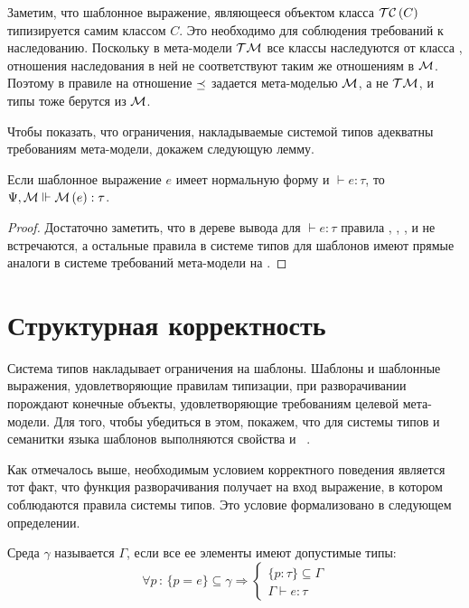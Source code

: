 {{Заметим, что шаблонное выражение, являющееся объектом класса $\mathcal{TC}\left(C\right)$ типизируется самим классом $C$. Это необходимо для соблюдения требований к наследованию. Поскольку в мета-модели $\mathcal{TM}$ все классы наследуются от класса , отношения наследования в ней не соответствуют таким же отношениям в $\mathcal{M}$. Поэтому в правиле  на  отношение $\preceq$ задается мета-моделью $\mathcal{M}$, а не $\mathcal{TM}$, и типы тоже берутся из $\mathcal{M}$. 

Чтобы показать, что ограничения, накладываемые системой типов адекватны требованиям мета-модели, докажем следующую лемму.
\begin{Lemm}\label{LemmNF}
Если шаблонное выражение $e$ имеет нормальную форму и $\vdash e : \tau$, то $\Psi, \mathcal{M} \Vdash \mathcal{M}\left(e\right) : \tau$.
\end{Lemm}
\begin{proof}
Достаточно заметить, что в дереве вывода для $\vdash e : \tau$ правила , , ,  и  не встречаются, а остальные правила в системе типов для шаблонов имеют прямые аналоги в системе требований мета-модели на .
\end{proof}

\section{Структурная корректность}

Система типов накладывает ограничения на шаблоны. Шаблоны и шаблонные выражения, удовлетворяющие правилам типизации, при разворачивании порождают конечные объекты, удовлетворяющие требованиям целевой мета-модели.
Для того, чтобы убедиться в этом, покажем, что для системы типов и семанитки языка шаблонов выполняются свойства  и ~\cite{Pierce}. 

Как отмечалось выше, необходимым условием корректного поведения является тот факт, что функция разворачивания получает на вход выражение, в котором соблюдаются правила системы типов. Это условие формализовано в следующем определении.

\begin{Def}\label{agree}
Среда $\gamma$ называется  $\Gamma$, если все ее элементы имеют допустимые типы:
$$
	\forall p \, : \, 
		\{p = e\} \subseteq \gamma 
			\Rightarrow 
		\left\{\begin{array}{l}		
		\{p : \tau\} \subseteq \Gamma \\
		\Gamma \vdash e : \tau
		\end{array}\right.
$$
\end{Def}

}}
